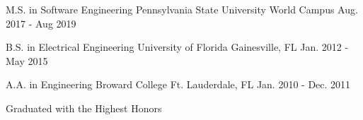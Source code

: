 

\begin{cventries}

	\cventry
	{M.S. in Software Engineering} %
	{Pennsylvania State University} %
	{World Campus} %
	{Aug. 2017 - Aug 2019} %
	{
		\begin{cvitems} %
		\end{cvitems}
	}

  \cventry
    {B.S. in Electrical Engineering} %
    {University of Florida} %
    {Gainesville, FL} %
    {Jan. 2012 - May 2015} %
		{
			\begin{cvitems} %
			\end{cvitems}
		}

	\cventry
		{A.A. in Engineering} %
		{Broward College} %
		{Ft. Lauderdale, FL} %
		{Jan. 2010 - Dec. 2011} %
		{
			\begin{cvitems} %
				\item {Graduated with the Highest Honors}
			\end{cvitems}
		}
\end{cventries}
